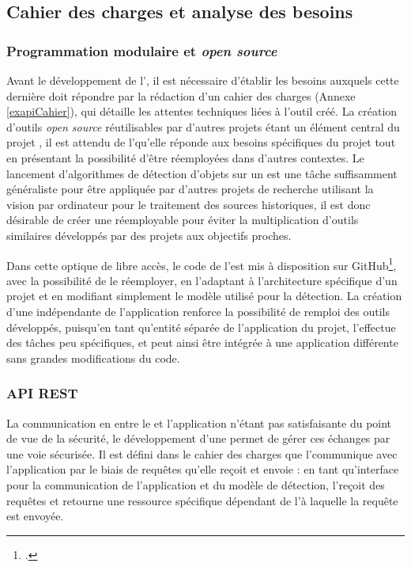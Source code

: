 \subsection{Cahier des charges et analyse des besoins}
    \subsubsection{Programmation modulaire et \textit{open source}}
    Avant le développement de l'\api, il est nécessaire d'établir les besoins auxquels cette dernière doit répondre par la rédaction d'un cahier des charges (Annexe \ref{exapiCahier}), qui détaille les attentes techniques liées à l'outil créé. La création d'outils \textit{open source} réutilisables par d'autres projets étant un élément central du projet \eida, il est attendu de l'\api qu'elle réponde aux besoins spécifiques du projet tout en présentant la possibilité d'être réemployées dans d'autres contextes. Le lancement d'algorithmes de détection d'objets sur un \gpu est une tâche suffisamment généraliste pour être appliquée par d'autres projets de recherche utilisant la vision par ordinateur pour le traitement des sources historiques, il est donc désirable de créer une \api réemployable pour éviter la multiplication d'outils similaires développés par des projets aux objectifs proches.
    
    Dans cette optique de libre accès, le code de l'\api est mis à disposition sur GitHub\footcite{norindrElementExtractionGPU2023}, avec la possibilité de le réemployer, en l'adaptant à l'architecture spécifique d'un projet et en modifiant simplement le modèle utilisé pour la détection. La création d'une \api indépendante de l'application \eida renforce la possibilité de remploi des outils développés, puisqu'en tant qu'entité séparée de l'application du projet, l'\api effectue des tâches peu spécifiques, et peut ainsi être intégrée à une application différente sans grandes modifications du code. 
    
    \subsubsection{API REST}
    La communication en \ssh entre le \gpu et l’application \eida n’étant pas satisfaisante du point de vue de la sécurité, le développement d’une \api permet de gérer ces échanges par une voie sécurisée. Il est défini dans le cahier des charges que l'\api communique avec l'application par le biais de requêtes \http qu'elle reçoit et envoie : en tant qu'interface pour la communication de l'application et du modèle de détection, l'\api reçoit des requêtes \http et retourne une ressource spécifique dépendant de l'\URL à laquelle la requête est envoyée.
    
